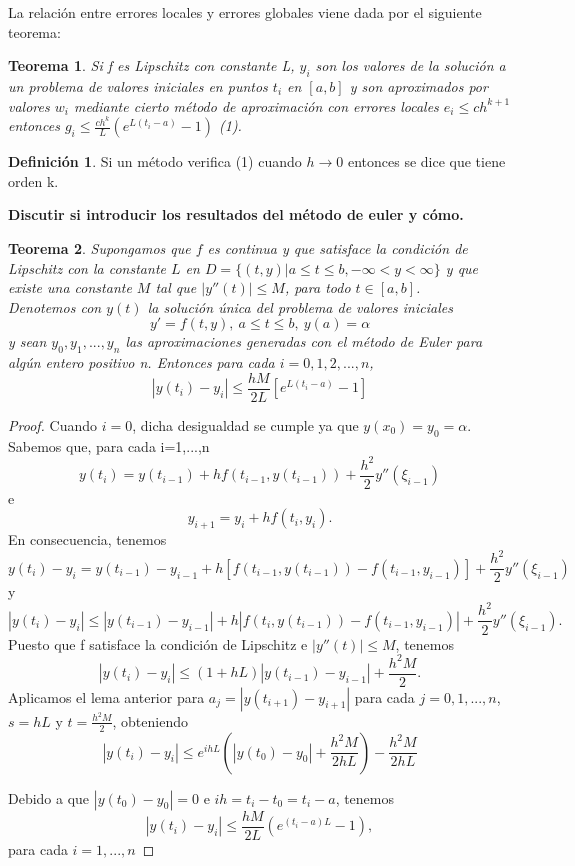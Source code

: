 \documentclass{article}
\theoremstyle{theorem-style}  %
\newtheorem{theorem}{Teorema}[section]  %
\theoremstyle{definition}
\newtheorem{definition}{Definición}[section]
\theoremstyle{example-style}
\begin{document}
	La relación entre errores locales y errores globales viene dada por el siguiente teorema: \\
	
	\begin{theorem}
	Si f es Lipschitz con constante L, $y_i$ son los valores de la solución a un problema de valores iniciales en puntos $t_i$ en $[a,b]$ y son aproximados por valores $w_i$ mediante cierto método de aproximación con errores locales $e_i \leq c h^{k+1}$ entonces $g_i \le \frac{c h^k}{L} (e^{L(t_i-a)}-1)$ (1).\\
	\end{theorem} 
	
	\begin{definition} Si un método verifica (1) cuando $h \to 0$ entonces se dice que tiene orden k.
	\end{definition}
	
	\textbf{Discutir si introducir los resultados del método de euler y cómo.}
	
	\begin{theorem}
		Supongamos que $f$ es continua y que satisface la condición de Lipschitz con la constante $L$ en $D=\{(t,y)|a \le t \le b, -\infty < y < \infty \}$ y que existe una constante $M$ tal que $|y''(t)| \le M$, para todo $t \in [a,b]$.
		\\
		
		Denotemos con $y(t)$ la solución única del problema de valores iniciales 
		$$y'=f(t,y), \: a \le t \le b, \: y(a)=\alpha$$
		y sean $y_0, y_1,...,y_n$ las aproximaciones generadas con el método de Euler para algún entero positivo n. Entonces para cada $i=0,1,2,...,n$,
		\begin{equation}
		\label{5.10}
		|y(t_i)-y_i| \le \frac{hM}{2L}[e^{L(t_i-a)}-1] 
		\end{equation}
	\end{theorem}
	
	\begin{proof}
		Cuando $i=0$, dicha desigualdad se cumple ya que $y(x_0)=y_0=\alpha$.\\
		
		Sabemos que, para cada i=1,...,n
		$$y(t_i)=y(t_{i-1})+hf(t_{i-1},y(t_{i-1}))+\frac{h^2}{2}y''(\xi_{i-1})$$
		e $$y_{i+1}=y_i+hf(t_i,y_i).$$
		En consecuencia, tenemos
		$$y(t_i)-y_i=y(t_{i-1})-y_{i-1}+h[f(t_{i-1},y(t_{i-1}))-f(t_{i-1},y_{i-1})]+\frac{h^2}{2}y''(\xi_{i-1})$$
		y
		$$|y(t_i)-y_i| \le |y(t_{i-1})-y_{i-1}|+h|f(t_i,y(t_{i-1}))-f(t_{i-1},y_{i-1})|+\frac{h^2}{2}y''(\xi_{i-1}).$$
		Puesto que f satisface la condición de Lipschitz e $|y''(t)| \le M$, tenemos 
		$$|y(t_i)-y_i| \le (1+hL)|y(t_{i-1})-y_{i-1}|+\frac{h^2M}{2}.$$
		Aplicamos el lema anterior para $a_j=|y(t_{i+1})-y_{i+1}|$ para cada $j=0,1,...,n$, $s=hL$ y $t=\frac{h^2M}{2}$, obteniendo
		\begin{equation}
		\label{0.3}
		|y(t_i)-y_i| \le e^{ihL}(|y(t_0)-y_0|+\frac{h^2M}{2hL})-\frac{h^2M}{2hL}
		\end{equation}
		
		Debido a que $|y(t_0)-y_0|=0$ e $ih=t_i-t_0=t_i-a$, tenemos
		$$|y(t_i)-y_i| \le \frac{hM}{2L}(e^{(t_i-a)L}-1), $$
		para cada $i=1,...,n$
	\end{proof}
	
\end{document}
